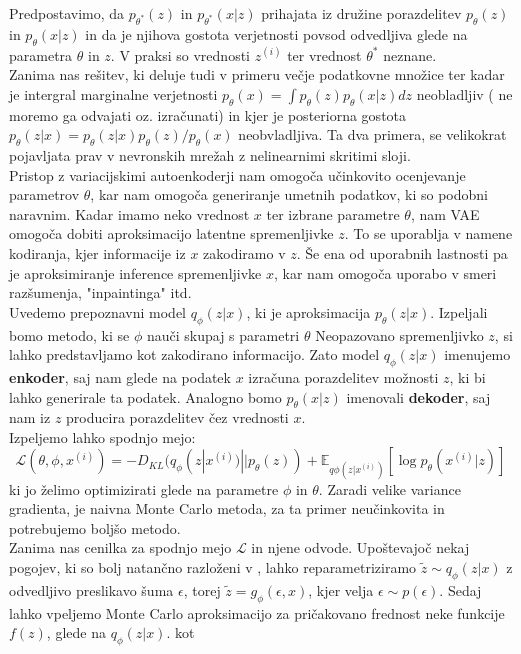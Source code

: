 \documentclass[12pt,a4paper,twoside]{article}
\theoremstyle{definition} %
\theoremstyle{plain} %
\numberwithin{equation}{section}  %
\begin{document}
Predpostavimo, da $p_{\theta^*}(z)$ in $p_{\theta^*}(x|z)$ prihajata iz družine porazdelitev 
$p_{\theta}(z)$ in $p_{\theta}(x|z)$ in da je njihova gostota verjetnosti povsod odvedljiva glede na parametra $\theta$ in $z$.  
V praksi so vrednosti $z^{(i)}$ ter vrednost $\theta^*$ neznane. \\
Zanima nas rešitev, ki deluje tudi v primeru večje podatkovne množice ter kadar je intergral marginalne verjetnosti 
$p_\theta (x) = \int p_\theta (z)p_\theta (x|z)dz$ neobladljiv ( ne moremo ga odvajati oz. izračunati) in kjer je posteriorna gostota
$p_\theta(z|x) = p_\theta(z|x)p_\theta(z)/p_\theta(x)$ neobvladljiva. Ta dva primera, se velikokrat pojavljata prav v nevronskih mrežah z nelinearnimi skritimi sloji. 
\\
Pristop z variacijskimi autoenkoderji nam omogoča učinkovito ocenjevanje parametrov $\theta$, kar nam omogoča generiranje umetnih podatkov, ki so podobni naravnim. Kadar imamo neko vrednost $x$ ter izbrane parametre $\theta$, nam VAE omogoča 
dobiti aproksimacijo latentne spremenljivke $z$. To se uporablja v namene kodiranja, kjer informacije iz $x$ zakodiramo v $z$. 
Še ena od uporabnih lastnosti pa je aproksimiranje inference spremenljivke $x$, kar nam omogoča uporabo v smeri razšumenja, "inpaintinga" itd. 
\\
Uvedemo prepoznavni model $q_\phi(z|x)$, ki je aproksimacija $p_\theta(z|x)$. Izpeljali bomo metodo, ki se  $\phi$ nauči skupaj s parametri $\theta$
Neopazovano spremenljivko $z$, si lahko predstavljamo kot zakodirano informacijo.  Zato model $q_\phi(z|x)$ imenujemo \textbf{enkoder}, saj nam glede na podatek  $x$ izračuna porazdelitev možnosti $z$, ki bi lahko generirale ta podatek. 
Analogno bomo $p_\theta(x|z)$ imenovali \textbf{dekoder}, saj nam iz $z$ producira porazdelitev čez vrednosti $x$.  
\\
Izpeljemo lahko spodnjo mejo: 
$$ \mathcal{L}(\theta,\phi,x^{(i)}) = - D_{KL}(q_\phi(z|x^{(i)})||p_\theta(z)) + \mathbb{E}_{q\phi (z|x^{(i)})}[\log{p_\theta(x^{(i)}|z)}] $$
ki jo želimo optimizirati glede na parametre $\phi$ in $\theta$.  Zaradi velike variance gradienta, je naivna Monte Carlo metoda, za ta primer neučinkovita in potrebujemo boljšo metodo. 
\\
Zanima nas cenilka za  spodnjo mejo $\mathcal{L}$ in njene odvode. Upoštevajoč nekaj pogojev, ki so bolj natančno razloženi v \cite{kingma2013auto}, lahko reparametriziramo $\tilde{z} \sim q_\phi(z|x)$ z odvedljivo preslikavo šuma $\epsilon$, torej 
$\tilde{z} = g_\phi(\epsilon,x)$, kjer velja $\epsilon \sim p(\epsilon)$.
Sedaj lahko vpeljemo Monte Carlo aproksimacijo za pričakovano frednost neke funkcije $f(z)$, glede na $q_\phi(z|x)$. kot
\end{document}
